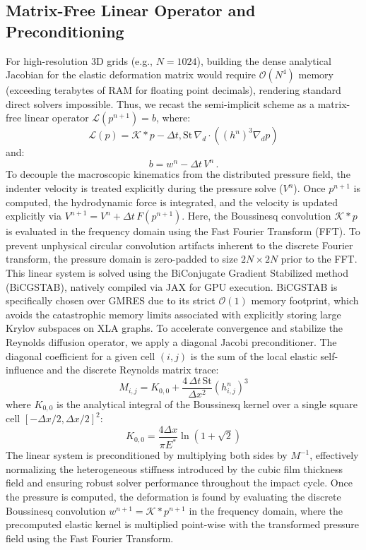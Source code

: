 \subsection{Matrix-Free Linear Operator and Preconditioning}

For high-resolution 3D grids (e.g., $N=1024$), building the dense analytical Jacobian for the elastic deformation matrix would require $\mathcal{O}(N^4)$ memory (exceeding terabytes of RAM for floating point decimals), rendering standard direct solvers impossible.
Thus, we recast the semi-implicit scheme as a matrix-free linear operator $\mathcal{L}(p^{n+1}) = b$, where:
\begin{equation}
    \mathcal{L}(p) = \mathcal{K} * p - \Delta t , \text{St} \, \nabla_d \cdot \left( (h^n)^3 \nabla_d p \right)
\end{equation}
and:
\begin{equation}
    b = w^n - \Delta t \, V^{n} \, .
\end{equation}
To decouple the macroscopic kinematics from the distributed pressure field, the indenter velocity is treated explicitly during the pressure solve ($V^n$).
Once $p^{n+1}$ is computed, the hydrodynamic force is integrated, and the velocity is updated explicitly via $V^{n+1} = V^n + \Delta t \, F(p^{n+1})$.
Here, the Boussinesq convolution $\mathcal{K} * p$ is evaluated in the frequency domain using the Fast Fourier Transform (FFT). 
To prevent unphysical circular convolution artifacts inherent to the discrete Fourier transform, the pressure domain is zero-padded to size $2N \times 2N$ prior to the FFT.
This linear system is solved using the BiConjugate Gradient Stabilized method (BiCGSTAB), natively compiled via JAX for GPU execution.
BiCGSTAB is specifically chosen over GMRES due to its strict $\mathcal{O}(1)$ memory footprint, which avoids the catastrophic memory limits associated with explicitly storing large Krylov subspaces on XLA graphs.
To accelerate convergence and stabilize the Reynolds diffusion operator, we apply a diagonal Jacobi preconditioner.
The diagonal coefficient for a given cell $(i, j)$ is the sum of the local elastic self-influence and the discrete Reynolds matrix trace:
\begin{equation}
    M_{i,j} = K_{0,0} + \frac{4 \, \Delta t \, \text{St}}{\Delta x^2} (h_{i,j}^n)^3
\end{equation}
where $K_{0,0}$ is the analytical integral of the Boussinesq kernel over a single square cell $[-\Delta x/2, \Delta x/2]^2$:
\begin{equation}
    K_{0,0} = \frac{4 \Delta x}{\pi E^*} \ln(1+\sqrt{2})
\end{equation}
The linear system is preconditioned by multiplying both sides by $M^{-1}$, effectively normalizing the heterogeneous stiffness introduced by the cubic film thickness field and ensuring robust solver performance throughout the impact cycle.
Once the pressure is computed, the deformation is found by evaluating the discrete Boussinesq convolution $w^{n+1} = \mathcal{K} * p^{n+1}$ in the frequency domain, where the precomputed elastic kernel is multiplied point-wise with the transformed pressure field using the Fast Fourier Transform.
